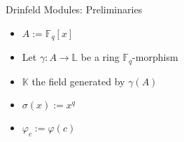 \documentclass{beamer}
\newcommand{\K}{\mathbb{K}}
\newcommand{\f}{\mathbb{F}}
\begin{document}

\begin{frame}{Drinfeld Modules: Preliminaries}
    \begin{itemize}
    \item $A:= \mathbb{F}_q[x]$

        \item Let $\gamma: A \to \mathbb{L} $ be a ring $\mathbb{F}_q$-morphism
        \item $\K$ the field generated by $\gamma(A)$
        \item $\sigma(x) := x^q$
        \item $\varphi_c := \varphi(c)$

    \end{itemize}
    
\end{frame}










\end{document}
